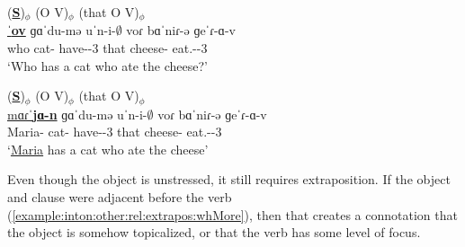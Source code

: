 \begin{exe}
	\ex \label{example:inton:other:rel:extrapos:whS} 
	\begin{xlist}
		
		\ex \glll (\underline{\textbf{S}})$_\phi$ ({{{O}}} V)$_\phi$  (that {{O}} V)$_\phi$ \\
		\underline{ˈ\textbf{ov}} {{ɡɑˈ{du}-mə}} {uˈ{n-i-$\emptyset$}}   voɾ {{bɑˈ{ni}ɾ-ə}} {ɡeˈɾ-ɑ-v} 
		\\
		who	cat-{\indf} have-{\thgloss}-3{\sg} that cheese-{} eat.{\aorperf}-{\pst}-3{\sg} 
		\\
		\trans `Who has a   cat who ate the cheese?'
		\\
		
		\ex \glll (\underline{\textbf{S}})$_\phi$ ({{{O}}} V)$_\phi$  (that {{O}} V)$_\phi$ \\
		\underline{mɑɾˈ\textbf{jɑ-n}} {{ɡɑˈ{du}-mə}} {uˈ{n-i-$\emptyset$}}   voɾ {{bɑˈ{ni}ɾ-ə}} {ɡeˈɾ-ɑ-v} 
		\\
		Maria-{} 	cat-{\indf}  have-{\thgloss}-3{\sg}  that cheese-{} eat.{\aorperf}-{\pst}-3{\sg} 
		\\
		\trans `\underline{Maria} has a   cat who ate the cheese'
		\\
	\end{xlist}
\end{exe}

Even though the object is unstressed, it still requires extraposition. If the object and clause were adjacent before the verb (\ref{example:inton:other:rel:extrapos:whMore}), then that creates a connotation that the object is somehow topicalized, or that the verb has some level of focus. 


